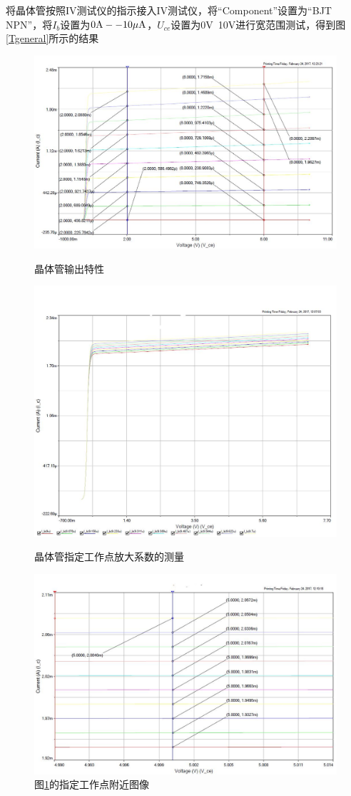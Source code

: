 \documentclass[UTF8,a4paper]{ctexart}
\begin{document}
将晶体管按照IV测试仪的指示接入IV测试仪，将“Component”设置为“BJT NPN”，将$I_b$设置为$0\rm{A} -- 10\rm{\mu A} $，$U_{ce}$设置为0V~10V进行宽范围测试，得到图\ref{Tgeneral}所示的结果 
\begin {figure}
\centering
\includegraphics[width=\textwidth]{cap/17.JPG}
\caption{晶体管输出特性}
\label{Tgeneral}
\includegraphics[width=\textwidth]{cap/2.JPG}
\caption{晶体管指定工作点放大系数的测量}
\label{micro}
\end{figure}
\begin{figure}
\centering
\includegraphics[width=\textwidth]{cap/4.JPG}
\caption{图\ref{micro}的指定工作点附近图像}
\label{large}
\end{figure}
\end{document}
